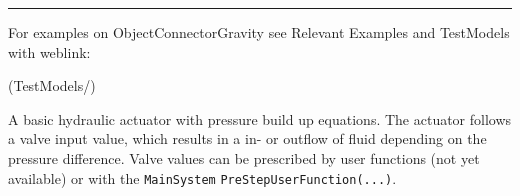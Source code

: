 \vspace{6pt}\par\noindent\rule{\textwidth}{0.4pt}
%
\noindent For examples on ObjectConnectorGravity see Relevant Examples and TestModels with weblink:
\bi
\item {} (TestModels/)

\ei

%
\newpage


\label{sec:item:ObjectConnectorHydraulicActuatorSimple}
A basic hydraulic actuator with pressure build up equations. The actuator follows a valve input value, which results in a in- or outflow of fluid depending on the pressure difference. Valve values can be prescribed by user functions (not yet available) or with the \texttt{MainSystem} \texttt{PreStepUserFunction(...)}.
\vspace{12pt}\\

